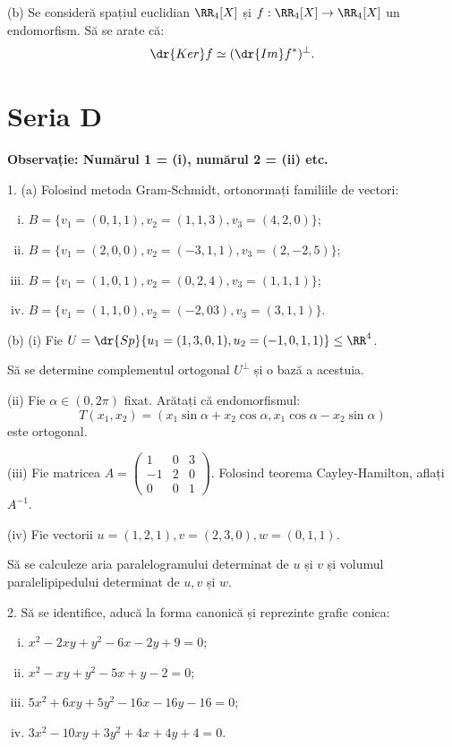 (b) Se consideră spațiul euclidian $ \RR_4[X] $ și $f : \RR_4[X] \to \RR_4[X] $
un endomorfism. Să se arate că:
\[
  \dr{Ker}f \simeq (\dr{Im}f^\ast)^\perp.
\]

\section{Seria D}

\textbf{Observație: Numărul 1 = (i), numărul 2 = (ii) etc.}

1. (a) Folosind metoda Gram-Schmidt, ortonormați familiile
de vectori:
\begin{enumerate}[(i)]
  \item $ B = \{ v_1 = (0, 1, 1), v_2 = (1, 1, 3), v_3 = (4, 2, 0) \} $;
  \item $ B = \{ v_1 = (2, 0, 0), v_2 = (-3, 1, 1), v_3 = (2, -2, 5) \} $;
  \item $ B = \{ v_1 = (1, 0, 1), v_2 = (0, 2, 4), v_3 = (1, 1, 1) \}$;
  \item $ B = \{ v_1 = (1, 1, 0), v_2 = (-2, 0 3), v_3 = (3, 1, 1) \}$.
\end{enumerate}

(b) (i) Fie $ U = \dr{Sp}\{u_1 = (1, 3, 0, 1), u_2 = (-1, 0, 1, 1) \} \leq \RR^4 $.

Să se determine complementul ortogonal $ U^\perp $ și o bază a acestuia.

(ii) Fie $ \alpha \in (0, 2\pi) $ fixat. Arătați că endomorfismul:
\[
  T(x_1, x_2) = (x_1 \sin \alpha + x_2 \cos \alpha, x_1 \cos \alpha - x_2 \sin \alpha)
\]
este ortogonal.

(iii) Fie matricea $ A = \begin{pmatrix} 1 & 0 & 3 \\ -1 & 2 & 0 \\ 0 & 0 & 1 \end{pmatrix} $.
Folosind teorema Cayley-Hamilton, aflați $ A^{-1} $.

(iv) Fie vectorii $ u = (1, 2, 1), v = (2, 3, 0), w = (0, 1, 1) $.

Să se calculeze aria paralelogramului determinat de $ u $ și $ v $ și volumul
paralelipipedului determinat de $ u, v $ și $ w $.

\vspace{1cm}

2. Să se identifice, aducă la forma canonică și reprezinte grafic conica:
\begin{enumerate}[(i)]
  \item $ x^2 - 2xy + y^2 - 6x - 2y + 9 = 0 $;
  \item $ x^2 - xy + y^2 - 5x + y - 2 = 0 $;
  \item $ 5x^2 + 6xy + 5y^2 - 16x - 16y - 16 = 0 $;
  \item $ 3x^2 - 10xy + 3y^2 + 4x + 4y + 4 = 0 $.
\end{enumerate}

